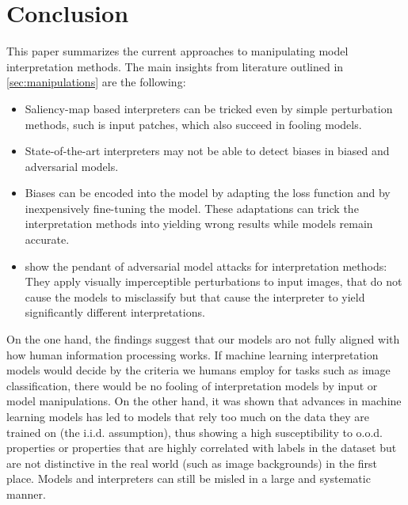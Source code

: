 \section{Conclusion}
\label{sec:discussion}

This paper summarizes the current approaches to manipulating model interpretation methods. 
The main insights from literature outlined in \autoref{sec:manipulations} are the following: 
\begin{itemize} %
    \item Saliency-map based interpreters can be tricked even by simple perturbation methods, such is input patches, which also succeed in fooling models. \cite{subramanya2019fooling}
    \item State-of-the-art interpreters may not be able to detect biases in biased and adversarial models.\cite{dimanov2020you, advlime_aies20}
    \item Biases can be encoded into the model by adapting the loss function and by inexpensively fine-tuning the model. These adaptations can trick the interpretation methods into yielding wrong results while models remain accurate. \cite{fooling_nn_interpreters}
    \item \cite{dombrowski2019explanations} show the pendant of adversarial model  attacks for interpretation methods: They apply visually imperceptible perturbations to input images, that do not cause the models to misclassify but that cause the interpreter to yield significantly different interpretations.
\end{itemize}
On the one hand, the findings suggest that our models aro not fully aligned with how human information processing works. If machine learning interpretation models would decide by the criteria we humans employ for tasks such as image classification, there would be no fooling of interpretation models by input or model manipulations. 
On the other hand, it was shown that advances in machine learning models has led to models that rely too much on the data they are trained on (the i.i.d. assumption), thus showing a high susceptibility to o.o.d. properties or properties that are highly correlated with labels in the dataset but are not distinctive in the real world (such as image backgrounds) in the first place. Models and interpreters can still be misled in a large and systematic manner. 

